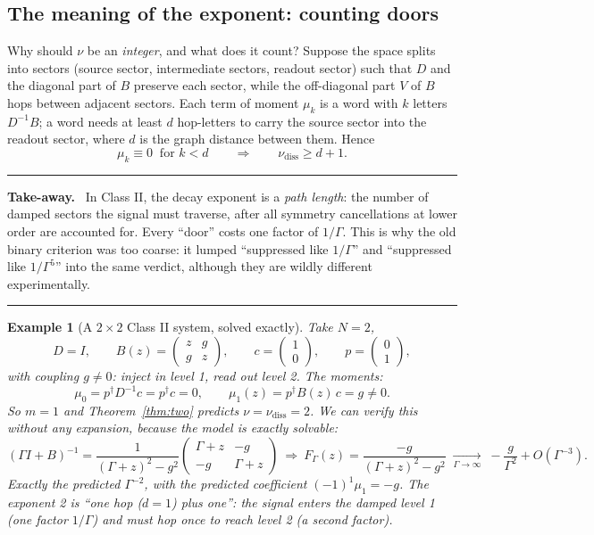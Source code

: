 \documentclass[11pt]{article}
\newtheorem{example}{Example}
\newcommand{\nudiss}{\nu_{\mathrm{diss}}}
\newenvironment{takeaway}
  {\par\medskip\noindent
   \begin{center}\begin{minipage}{0.92\textwidth}
   \hrule\medskip\noindent\textbf{Take-away.}\ }
  {\medskip\hrule\end{minipage}\end{center}\medskip}
\begin{document}
\subsection{The meaning of the exponent: counting doors}

Why should $\nu$ be an \emph{integer}, and what does it count?  Suppose the
space splits into sectors (source sector, intermediate sectors, readout
sector) such that $D$ and the diagonal part of $B$ preserve each sector,
while the off-diagonal part $V$ of $B$ hops between adjacent sectors.  Each
term of moment $\mu_k$ is a word with $k$ letters $D^{-1}B$; a word needs at
least $d$ hop-letters to carry the source sector into the readout sector,
where $d$ is the graph distance between them.  Hence
\[
\mu_k\equiv0\ \text{ for } k<d
\qquad\Longrightarrow\qquad \nudiss\ge d+1 .
\]
\begin{takeaway}
In Class II, the decay exponent is a \emph{path length}: the number of damped
sectors the signal must traverse, after all symmetry cancellations at lower
order are accounted for.  Every ``door'' costs one factor of $1/\Gamma$.
This is why the old binary criterion was too coarse: it lumped
``suppressed like $1/\Gamma$'' and ``suppressed like $1/\Gamma^{5}$''
into the same verdict, although they are wildly different experimentally.
\end{takeaway}

\begin{example}[A $2\times2$ Class II system, solved exactly]
\label{ex:classII}
Take $N=2$,
\[
D=I,\qquad
B(z)=\begin{pmatrix}z & g\\ g & z\end{pmatrix},\qquad
c=\begin{pmatrix}1\\0\end{pmatrix},\qquad
p=\begin{pmatrix}0\\1\end{pmatrix},
\]
with coupling $g\neq0$: inject in level 1, read out level 2.  The moments:
\[
\mu_0=p^\dagger D^{-1}c=p^\dagger c=0,
\qquad
\mu_1(z)=p^\dagger B(z)\,c = g\neq0 .
\]
So $m=1$ and Theorem~\ref{thm:two} predicts $\nu=\nudiss=2$.  We can verify
this without any expansion, because the model is exactly solvable:
\[
(\Gamma I+B)^{-1}
=\frac{1}{(\Gamma+z)^2-g^2}
\begin{pmatrix}\Gamma+z&-g\\-g&\Gamma+z\end{pmatrix}
\ \Longrightarrow\
F_\Gamma(z)=\frac{-g}{(\Gamma+z)^2-g^2}
\;\xrightarrow[\Gamma\to\infty]{}\;
-\frac{g}{\Gamma^{2}}+O(\Gamma^{-3}).
\]
Exactly the predicted $\Gamma^{-2}$, with the predicted coefficient
$(-1)^1\mu_1=-g$.  The exponent 2 is ``one hop ($d=1$) plus one'': the signal
enters the damped level 1 (one factor $1/\Gamma$) and must hop once to reach
level 2 (a second factor).
\end{example}
\end{document}
